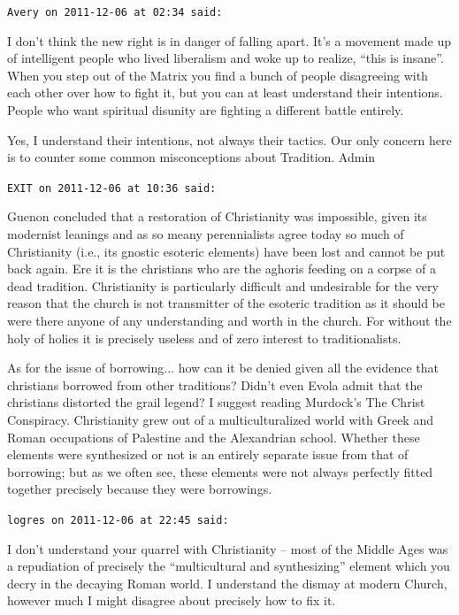 \begin{footnotesize}
\begin{sffamily}
\texttt{Avery on 2011-12-06 at 02:34 said:}

I don't think the new right is in danger of falling apart. It's a movement made up of intelligent people who lived liberalism and woke up to realize, ``this is insane''. When you step out of the Matrix you find a bunch of people disagreeing with each other over how to fight it, but you can at least understand their intentions. People who want spiritual disunity are fighting a different battle entirely.

Yes, I understand their intentions, not always their tactics. Our only concern here is to counter some common misconceptions about Tradition. Admin

\hfill

\texttt{EXIT on 2011-12-06 at 10:36 said:}

Guenon concluded that a restoration of Christianity was impossible, given its modernist leanings and as so meany perennialists agree today so much of Christianity (i.e., its gnostic esoteric elements) have been lost and cannot be put back again. Ere it is the christians who are the aghoris feeding on a corpse of a dead tradition. Christianity is particularly difficult and undesirable for the very reason that the church is not transmitter of the esoteric tradition as it should be were there anyone of any understanding and worth in the church. For without the holy of holies it is precisely useless and of zero interest to traditionalists.

As for the issue of borrowing... how can it be denied given all the evidence that christians borrowed from other traditions? Didn't even Evola admit that the christians distorted the grail legend? I suggest reading Murdock's The Christ Conspiracy. Christianity grew out of a multiculturalized world with Greek and Roman occupations of Palestine and the Alexandrian school. Whether these elements were synthesized or not is an entirely separate issue from that of borrowing; but as we often see, these elements were not always perfectly fitted together precisely because they were borrowings.

\hfill

\texttt{logres on 2011-12-06 at 22:45 said:}

I don't understand your quarrel with Christianity -- most of the Middle Ages was a repudiation of precisely the ``multicultural and synthesizing'' element which you decry in the decaying Roman world. I understand the dismay at modern Church, however much I might disagree about precisely how to fix it.


\end{sffamily}
\end{footnotesize}
